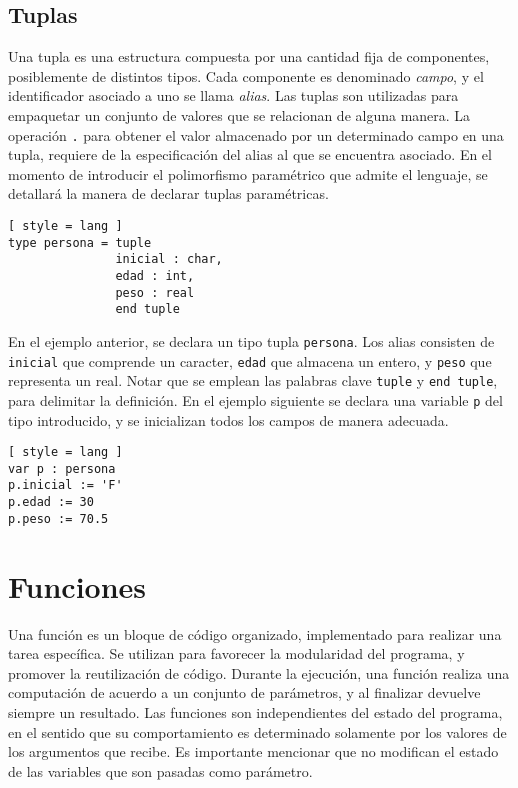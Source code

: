 \subsection{Tuplas}

Una tupla es una estructura compuesta por una cantidad fija de componentes, posiblemente de distintos tipos.
Cada componente es denominado \textit{campo}, y el identificador asociado a uno se llama \textit{alias}.
Las tuplas son utilizadas para empaquetar un conjunto de valores que se relacionan de alguna manera.
La operación \lstinline[style = lang]{.} para obtener el valor almacenado por un determinado campo en una tupla, requiere de la especificación del alias al que se encuentra asociado.
En el momento de introducir el polimorfismo paramétrico que admite el lenguaje, se detallará la manera de declarar tuplas paramétricas.

\begin{lstlisting}[ style = lang ]
type persona = tuple
               inicial : char,
               edad : int,
               peso : real
               end tuple
\end{lstlisting}

En el ejemplo anterior, se declara un tipo tupla \lstinline[style = lang]{persona}.
Los alias consisten de \lstinline[style = lang]{inicial} que comprende un caracter, \lstinline[style = lang]{edad} que almacena un entero, y \lstinline[style = lang]{peso} que representa un real.
Notar que se emplean las palabras clave \lstinline[style = lang]{tuple} y \lstinline[style = lang]{end tuple}, para delimitar la definición.
En el ejemplo siguiente se declara una variable \lstinline[style = lang]{p} del tipo introducido, y se inicializan todos los campos de manera adecuada.

\begin{lstlisting}[ style = lang ]
var p : persona
p.inicial := 'F'
p.edad := 30
p.peso := 70.5
\end{lstlisting}




\section{Funciones}

Una función es un bloque de código organizado, implementado para realizar una tarea específica.
Se utilizan para favorecer la modularidad del programa, y promover la reutilización de código.
Durante la ejecución, una función realiza una computación de acuerdo a un conjunto de parámetros, y al finalizar devuelve siempre un resultado.
Las funciones son independientes del estado del programa, en el sentido que su comportamiento es determinado solamente por los valores de los argumentos que recibe.
Es importante mencionar que no modifican el estado de las variables que son pasadas como parámetro.


